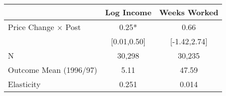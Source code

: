 \begin{tabular}{lcc}
\midrule
                    &\multicolumn{1}{c}{Log Income}&\multicolumn{1}{c}{Weeks Worked}\\
\midrule
Price Change $\times$ Post&        0.25* &        0.66  \\
                    & [0.01,0.50]  &[-1.42,2.74]  \\
\addlinespace
\midrule
N                   &      30,298  &      30,235  \\
Outcome Mean (1996/97)&        5.11  &       47.59  \\
Elasticity          &       0.251  &       0.014  \\
\midrule
\end{tabular}
